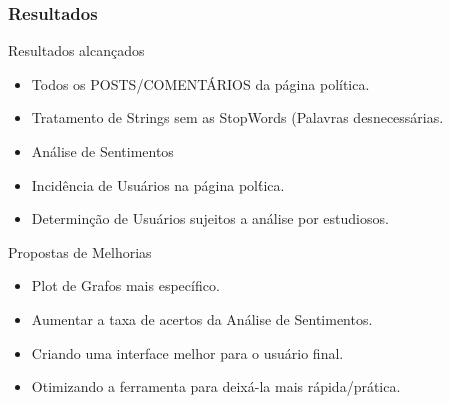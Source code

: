 \documentclass{beamer}
\begin{document}
\begin{frame}
	\frametitle{Resultados}
	\begin{block}{Resultados alcan\c{c}ados}
		\begin{itemize}
			\item Todos os POSTS/COMENT\'ARIOS da p\'agina pol\'itica.
			\item Tratamento de Strings sem as StopWords (Palavras desnecess\'arias.
			\item An\'alise de Sentimentos
			\item Incid\^encia de Usu\'arios na p\'agina pol\'tica.
			\item Determin\c{c}\~ao de Usu\'arios sujeitos a an\'alise por estudiosos.
		\end{itemize}
	\end{block}
	\begin{block}{Propostas de Melhorias}
		\begin{itemize}
			\item Plot de Grafos mais espec\'ifico.
			\item Aumentar a taxa de acertos da An\'alise de Sentimentos.
			\item Criando uma interface melhor para o usu\'ario final.
			\item Otimizando a ferramenta para deix\'a-la mais r\'apida/pr\'atica.
		\end{itemize}
	\end{block}
\end{frame}
\end{document}
